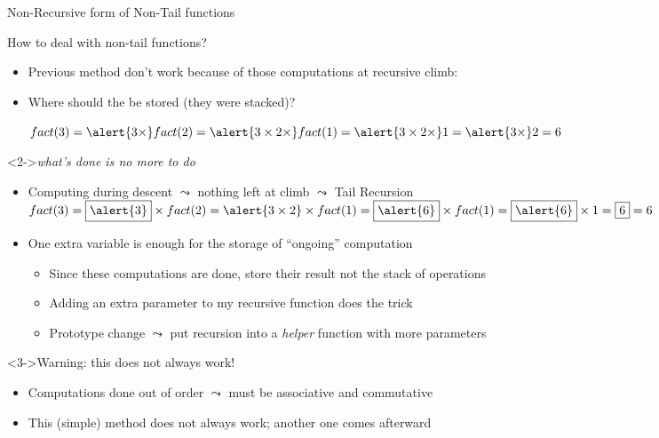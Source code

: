 \begin{frame}{Non-Recursive form of Non-Tail functions}
  \begin{block}{How to deal with non-tail functions?}
  \begin{itemize}
  \item Previous method don't work because of those computations at recursive
    climb:
  \item Where should the  be stored (they were stacked)?
    
    $fact(3)=\alert{3\times} fact(2)=\alert{3\times 2\times}
    fact(1)=\alert{3\times 2\times} 1=\alert{3\times} 2=6$ 
  \end{itemize}
\end{block}\vspace{-.7\baselineskip}
\begin{block}<2->{{\it what's done is no more to do}}
  \begin{itemize}
  \item Computing during descent $\leadsto$ nothing left at climb $\leadsto$ Tail Recursion\\[2pt]

    $fact(3)=\fbox{\alert{3}}\times fact(2)=\alert{3\times 2}\times
    fact(1)=\fbox{\alert{6}}\times fact(1)=\fbox{\alert{6}}\times
    1=\fbox{6}=6$\\[4pt]

  \item One extra variable is enough for the storage of ``ongoing'' computation
    \begin{itemize}
    \item Since these computations are done, store their result not the
      stack of operations
    \item Adding an extra parameter to my recursive function does the trick
    \item Prototype change $\leadsto$ put recursion into a \textit{helper}
      function with more parameters
    \end{itemize}
  \end{itemize}
\end{block}\vspace{-.7\baselineskip}

\begin{block}<3->{\alert{Warning:} this does not always work!}
  \begin{itemize}
  \item Computations done out of order $\leadsto$ must be \alert{associative}
    and \alert{commutative}
  \item This (simple) method does not always work; another one comes afterward
  \end{itemize}
  \end{block}
\end{frame}
